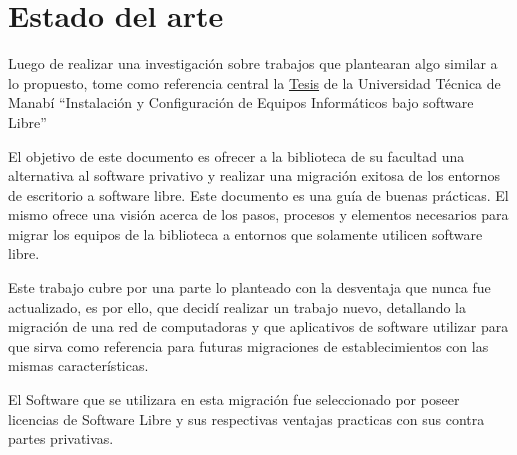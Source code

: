 \chapter{Estado del arte}\label{cap:estado}

	Luego de realizar una investigación sobre trabajos que plantearan algo similar a lo propuesto, tome como referencia central la \href{https://1library.co/document/4yr1o87q-universidad-tecnica-de-manabi-facultad-de-ciencias-informaticas.html}{\color{blue}Tesis} de la Universidad Técnica de Manabí “Instalación y Configuración de Equipos Informáticos bajo software Libre”\par
	
	El objetivo de este documento es ofrecer a la biblioteca de su facultad una alternativa al software privativo y realizar una migración exitosa de los entornos de escritorio a software libre. Este documento es una guía de buenas prácticas. El mismo ofrece una visión acerca de los pasos, procesos y elementos necesarios para migrar los equipos de la biblioteca a entornos que solamente utilicen software libre. \par
	
	Este trabajo cubre por una parte lo planteado con la desventaja que nunca fue actualizado, es por ello, que decidí realizar un trabajo nuevo, detallando la migración de una red de computadoras y que aplicativos de software utilizar para que sirva como referencia para futuras migraciones de establecimientos con las mismas características. \par
	
	El Software que se utilizara en esta migración fue seleccionado por poseer licencias de Software Libre y sus respectivas ventajas practicas con sus contra partes privativas.\par